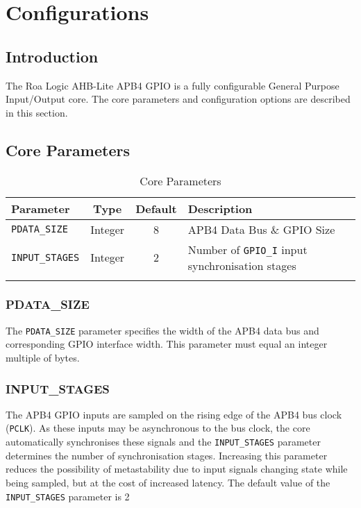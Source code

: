 \chapter{Configurations}\label{configurations}

\section{Introduction}\label{introduction-1}

The Roa Logic AHB-Lite APB4 GPIO is a fully configurable General Purpose
Input/Output core. The core parameters and configuration options are
described in this section.

\section{Core Parameters}\label{core-parameters}

\begin{longtable}[]{@{}lccl@{}}
\toprule
Parameter & Type & Default & Description\tabularnewline
\midrule
\endhead
\texttt{PDATA\_SIZE} & Integer & 8 & APB4 Data Bus \& GPIO Size\tabularnewline
\texttt{INPUT\_STAGES} & Integer & 2 & Number of \texttt{GPIO\_I} input synchronisation
stages\tabularnewline
\bottomrule
\caption{Core Parameters}
\end{longtable}

\subsection{PDATA\_SIZE}\label{pdata_size}

The \texttt{PDATA\_SIZE} parameter specifies the width of the APB4 data bus and
corresponding GPIO interface width. This parameter must equal an integer
multiple of bytes.

\subsection{INPUT\_STAGES}\label{input_stages}

The APB4 GPIO inputs are sampled on the rising edge of the APB4 bus clock (\texttt{PCLK}). As these inputs may be asynchronous to the bus clock, the core automatically synchronises these signals and the \texttt{INPUT\_STAGES} parameter determines the number of synchronisation stages. Increasing this parameter reduces the possibility of metastability due to input signals changing state while being sampled, but at the cost of increased latency. The default value of the \texttt{INPUT\_STAGES} parameter is 2


